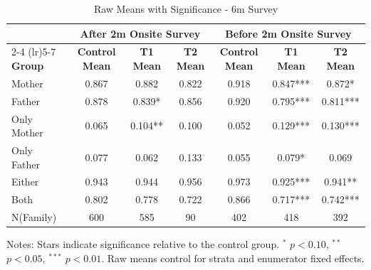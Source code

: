 \begin{table}[htbp]
\centering
\begin{threeparttable}
\caption{Raw Means with Significance  - 6m Survey}
\begin{tabular}{lcccccc}
\toprule
& \multicolumn{3}{c}{After 2m Onsite Survey} & \multicolumn{3}{c}{Before 2m Onsite Survey} \\
\cmidrule(lr){2-4} \cmidrule(lr){5-7}
\textbf{Group} & \textbf{Control Mean} & \textbf{T1 Mean} & \textbf{T2 Mean} & \textbf{Control Mean} & \textbf{T1 Mean} & \textbf{T2 Mean} \\
\midrule
Mother &  0.867 &  0.882 &  0.822 &  0.918 &  0.847*** &  0.872* \\
Father &  0.878 &  0.839* &  0.856 & 0.920 &  0.795*** &  0.811*** \\
Only Mother &  0.065 &  0.104** &  0.100 &  0.052 &  0.129*** &  0.130*** \\
Only Father &  0.077 &  0.062 &  0.133 &  0.055 &  0.079* &  0.069 \\
Either &  0.943 &  0.944 &  0.956 & 0.973 &  0.925*** &  0.941** \\
Both &  0.802 &  0.778 &  0.722 &  0.866 &  0.717*** &  0.742***  \\
N(Family) & 600 & 585 & 90  &  402 & 418 & 392   \\
\bottomrule
\end{tabular}
\begin{tablenotes}
\small
Notes: Stars indicate significance relative to the control group. 
$^{*}$ $p<0.10$, $^{**}$ $p<0.05$, $^{***}$ $p<0.01$.
Raw means control for strata and enumerator fixed effects.
\end{tablenotes}
\end{threeparttable}
\end{table}

